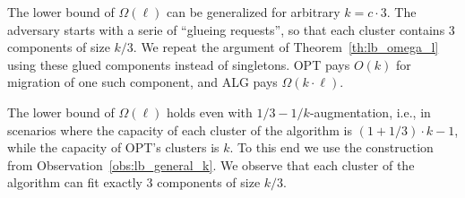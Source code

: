 \begin{observation}
  The lower bound of $\Omega(\ell)$ can be generalized for arbitrary $k = c\cdot 3$.
  The adversary starts with a serie of ``glueing requests'', so that each cluster contains 3 components of size $k/3$.
  We repeat the argument of Theorem~\ref{th:lb_omega_l} using these glued components instead of singletons.
  OPT pays $O(k)$ for migration of one such component, and ALG pays $\Omega(k \cdot \ell)$.
  \label{obs:lb_general_k}
\end{observation}

\begin{observation}
  The lower bound of $\Omega(\ell)$ holds even with $1/3-1/k$-augmentation, i.e., in scenarios where the capacity of each cluster of the algorithm is $(1+1/3)\cdot k - 1$, while the capacity of OPT's clusters is $k$.
  To this end we use the construction from Observation~\ref{obs:lb_general_k}.
  We observe that each cluster of the algorithm can fit exactly $3$ components of size $k/3$.
\end{observation}


